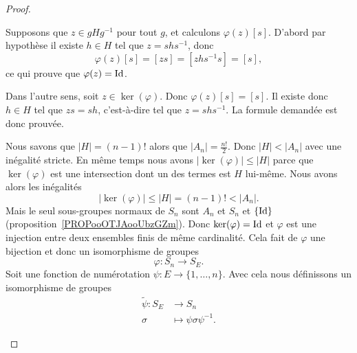 \begin{proof}
\begin{subproof}
\begin{subproof}
                \item[\( \ker(\varphi)=\bigcap_{g\in S_n}gHg^{-1}\)]

                    Supposons que \( z\in gHg^{-1}\) pour tout \( g\), et calculons \( \varphi(z)[s]\). D'abord par hypothèse il existe \( h\in H\) tel que \( z=shs^{-1}\), donc
                    \begin{equation}
                        \varphi(z)[s]=[zs]=[zhs^{-1}s]=[s],
                    \end{equation}
                    ce qui prouve que \( \varphi(z)=\operatorname{Id}\).

                    Dans l'autre sens, soit \( z\in\ker(\varphi)\). Donc \( \varphi(z)[s]=[s]\). Il existe donc \( h\in H\) tel que \( zs=sh\), c'est-à-dire tel que \( z=shs^{-1}\). La formule demandée est donc prouvée.

                \item[Questions d'ordre]

                    Nous savons que \( | H |=(n-1)!\) alors que \( | A_n |=\frac{ n! }{2}\). Donc \( | H |<| A_n |\) avec une inégalité stricte. En même temps nous avons \( | \ker(\varphi) |\leq | H |\) parce que \( \ker(\varphi)\) est une intersection dont un des termes est \( H\) lui-même. Nous avons alors les inégalités
                    \begin{equation}
                        | \ker(\varphi) |\leq | H |=(n-1)!<| A_n |.
                    \end{equation}
                    Mais le seul sous-groupes normaux de \( S_n\) sont \( A_n\) et \( S_n\) et \( \{ \operatorname{Id} \}\) (proposition~\ref{PROPooOTJAooUbzGZm}). Donc \( \ker(\varphi)=\operatorname{Id}\) et \( \varphi\) est une injection entre deux ensembles finis de même cardinalité. Cela fait de \( \varphi\) une bijection et donc un isomorphisme de groupes
                    \begin{equation}
                        \varphi\colon S_n\to S_E.
                    \end{equation}
                    Soit une fonction de numérotation \( \psi\colon E\to \{ 1,\ldots, n \}\). Avec cela nous définissons un isomorphisme de groupes
                    \begin{equation}
                        \begin{aligned}
                            \tilde \psi\colon S_E&\to S_n \\
                            \sigma&\mapsto \psi\sigma\psi^{-1}.
                        \end{aligned}
                    \end{equation}


\end{subproof}
\end{subproof}
\end{proof}
